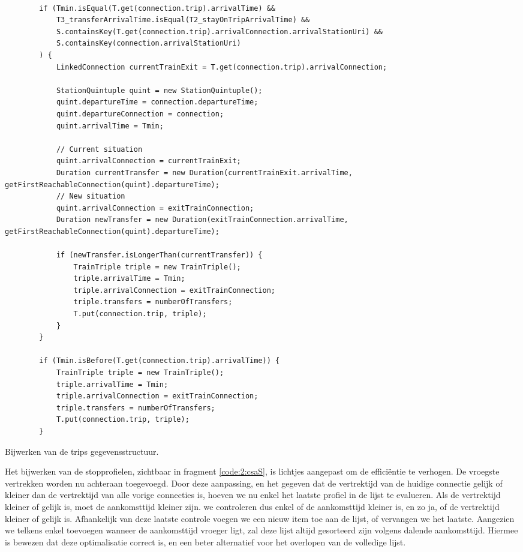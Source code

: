 \begin{code}[h]
	\begin{verbatim}
	
		if (Tmin.isEqual(T.get(connection.trip).arrivalTime) && 
			T3_transferArrivalTime.isEqual(T2_stayOnTripArrivalTime) &&
			S.containsKey(T.get(connection.trip).arrivalConnection.arrivalStationUri) &&
			S.containsKey(connection.arrivalStationUri)
		) {
			LinkedConnection currentTrainExit = T.get(connection.trip).arrivalConnection;
			
			StationQuintuple quint = new StationQuintuple();
			quint.departureTime = connection.departureTime;
			quint.departureConnection = connection;
			quint.arrivalTime = Tmin;
			
			// Current situation
			quint.arrivalConnection = currentTrainExit;
			Duration currentTransfer = new Duration(currentTrainExit.arrivalTime, getFirstReachableConnection(quint).departureTime);
			// New situation
			quint.arrivalConnection = exitTrainConnection;
			Duration newTransfer = new Duration(exitTrainConnection.arrivalTime, getFirstReachableConnection(quint).departureTime);
	
			if (newTransfer.isLongerThan(currentTransfer)) {
				TrainTriple triple = new TrainTriple();
				triple.arrivalTime = Tmin;
				triple.arrivalConnection = exitTrainConnection;
				triple.transfers = numberOfTransfers;
				T.put(connection.trip, triple);
			}
		}
		
		if (Tmin.isBefore(T.get(connection.trip).arrivalTime)) {
			TrainTriple triple = new TrainTriple();
			triple.arrivalTime = Tmin;
			triple.arrivalConnection = exitTrainConnection;
			triple.transfers = numberOfTransfers;
			T.put(connection.trip, triple);
		}
	\end{verbatim}
	\caption[CSA: Bijwerken T]{Bijwerken van de trips gegevensstructuur.}
	\label{code:2:csaT}
\end{code}

Het bijwerken van de stopprofielen, zichtbaar in fragment \ref{code:2:csaS}, is lichtjes aangepast om de efficiëntie te verhogen. De vroegste vertrekken worden nu achteraan toegevoegd. Door deze aanpassing, en het gegeven dat de vertrektijd van de huidige connectie gelijk of kleiner dan de vertrektijd van alle vorige connecties is, hoeven we nu enkel het laatste profiel in de lijst te evalueren. Als de vertrektijd kleiner of gelijk is, moet de aankomsttijd kleiner zijn. we controleren dus enkel of de aankomsttijd kleiner is, en zo ja, of de vertrektijd kleiner of gelijk is. Afhankelijk van deze laatste controle voegen we een nieuw item toe aan de lijst, of vervangen we het laatste. Aangezien we telkens enkel toevoegen wanneer de aankomsttijd vroeger ligt, zal deze lijst altijd gesorteerd zijn volgens dalende aankomsttijd. Hiermee is bewezen dat deze optimalisatie correct is, en een beter alternatief voor het overlopen van de volledige lijst.

